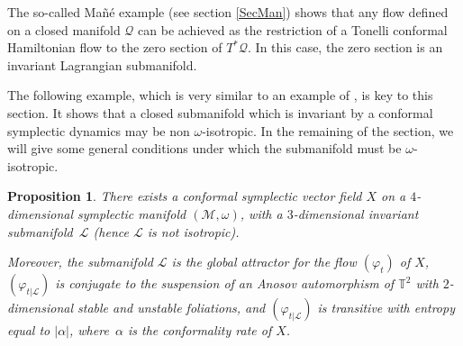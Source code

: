 \documentclass[11pt]{article}
\numberwithin{equation}{section}
\numberwithin{figure}{section}
\numberwithin{table}{section}
\newtheorem{proposition}{Proposition}
\theoremstyle{definition}
\def\T{\mathbb{T}}
\def\cL{{\mathcal L}}
\def\cM{{\mathcal M}}
\def\cQ{{\mathcal Q}}
\begin{document}
The so-called Mañé example \cite{Man1992} (see section \ref{SecMan}) shows that any flow defined on a closed manifold $\cQ$ can be achieved as the restriction of a Tonelli conformal
Hamiltonian flow to the zero section of $T^*\cQ$. In this case, the zero section is an invariant Lagrangian submanifold.

The following example, which is very similar to an example of \cite{Geiges1995}, is key to this section. It shows that a closed submanifold which is invariant by a conformal symplectic dynamics may be non $\omega$-isotropic. In the remaining of the section, we will give some general conditions under which the submanifold must be $\omega$-isotropic.

\begin{proposition}\label{Pflownonisotrop}
There exists a conformal symplectic vector field $X$ on a $4$\nobreakdash-dimen\-sional symplectic manifold $({\cM}, \omega)$, with a $3$\nobreakdash-dimensional invariant submani\-fold~${\cL}$ (hence ${\cL}$ is not isotropic).

Moreover, the submanifold ${\cL}$ is the global attractor for the flow $(\varphi_t)$ of $X$, $(\varphi_{t|\cL})$ is conjugate to the suspension of an Anosov automorphism of $\T^2$ with $2$\nobreakdash-dimensional stable and unstable foliations, and $(\varphi_{t|\cL})$ is transitive with entropy equal to $|\alpha|$, where~$\alpha$ is the conformality rate of $X$.
\end{proposition}
\end{document}
